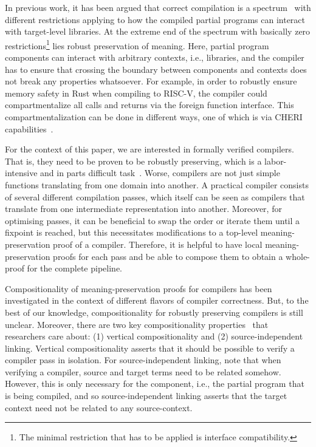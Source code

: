   In previous work, it has been argued that correct compilation is a spectrum~\cite{} with different restrictions applying to how the compiled partial programs can interact with target-level libraries.
  At the extreme end of the spectrum with basically zero restrictions\footnote{The minimal restriction that has to be applied is interface compatibility.} lies robust preservation of meaning.
  Here, partial program components can interact with arbitrary contexts, i.e., libraries, and the compiler has to ensure that crossing the boundary between components and contexts does not break any properties whatsoever.
  For example, in order to robustly ensure memory safety in Rust when compiling to RISC-V, the compiler could compartmentalize all calls and returns via the foreign function interface.
  This compartmentalization can be done in different ways, one of which is via CHERI capabilities~\cite{}.

  For the context of this paper, we are interested in formally verified compilers.
  That is, they need to be proven to be robustly preserving, which is a labor-intensive and in parts difficult task~\cite{}. %
  Worse, compilers are not just simple functions translating from one domain into another. 
  A practical compiler consists of several different compilation passes, which itself can be seen as compilers that translate from one intermediate representation into another.
  Moreover, for optimising passes, it can be beneficial to swap the order or iterate them until a fixpoint is reached, but this necessitates modifications to a top-level meaning-preservation proof of a compiler.
  Therefore, it is helpful to have local meaning-preservation proofs for each pass and be able to compose them to obtain a whole-proof for the complete pipeline.

  Compositionality of meaning-preservation proofs for compilers has been investigated in the context of different flavors of compiler correctness. 
  But, to the best of our knowledge, compositionality for robustly preserving compilers is still unclear.
  Moreover, there are two key compositionality properties~\cite{} that researchers care about: (1) vertical compositionality and (2) source-independent linking. 
  Vertical compositionality asserts that it should be possible to verify a compiler pass in isolation.
  For source-independent linking, note that when verifying a compiler, source and target terms need to be related somehow.
  However, this is only necessary for the component, i.e., the partial program that is being compiled, and so source-independent linking asserts that the target context need not be related to any source-context.

